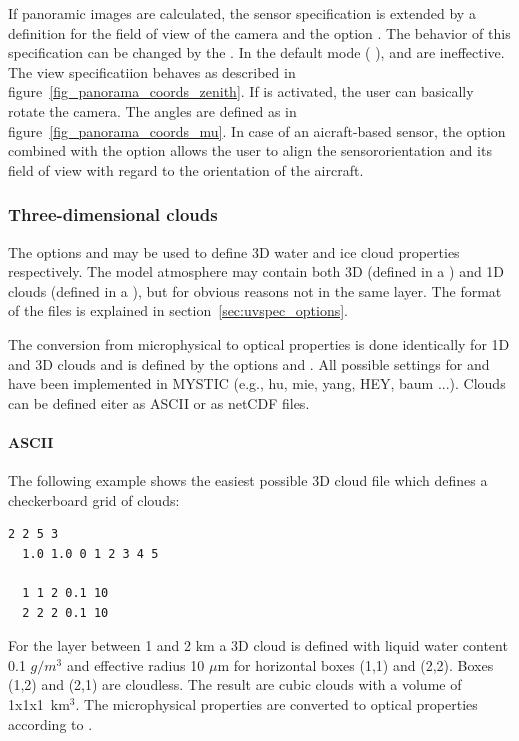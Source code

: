 {If panoramic images are calculated, the sensor specification is extended by a definition for the field of view of the camera and the option .
The behavior of this specification can be changed by the .
In the default mode ( ),  and  are ineffective.
The view specificatiion behaves as described in figure~\ref{fig_panorama_coords_zenith}.
If   is activated, the user can basically rotate the camera.
The angles are defined as in figure~\ref{fig_panorama_coords_mu}.
In case of an aicraft-based sensor, the option   combined with the option  allows the user to align the sensororientation and its field of view with regard to the orientation of the aircraft.

\subsubsection{Three-dimensional clouds}

The options 
and  may be used to define 3D water and ice
cloud properties respectively. The model atmosphere may contain both 3D 
(defined in a ) and 1D clouds (defined in a 
), but for obvious reasons not in the same layer. The format
of the files is explained in section~\ref{sec:uvspec_options}. 

The conversion from microphysical to optical properties 
is done identically for 1D and 3D clouds and is defined 
by the options  and . All
possible settings for  and 
have been implemented in MYSTIC (e.g., hu, mie, yang, HEY, baum ...).
Clouds can be defined eiter as ASCII or as netCDF files.

\paragraph{ASCII}
The following example shows the easiest possible 3D 
cloud file which defines a checkerboard grid of clouds:
\begin{Verbatim}[fontsize=\footnotesize, frame=single, samepage=true]
  2 2 5 3
  1.0 1.0 0 1 2 3 4 5 

  1 1 2 0.1 10
  2 2 2 0.1 10
\end{Verbatim}
For the layer between 1 and 2 km a 3D cloud is defined with liquid water
content 0.1 $g/m^3$ and effective radius 10 $\mu$m for horizontal 
boxes (1,1) and (2,2). Boxes (1,2) and (2,1) are cloudless. The result are
cubic clouds with a volume of 1x1x1~km$^3$. The microphysical properties are
converted to optical properties according to .  

}
